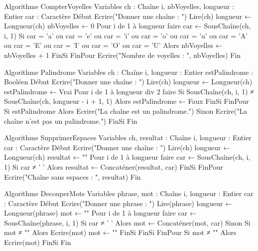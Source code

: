 \begin{algo}
Algorithme CompterVoyelles
Variables
    ch : Chaîne
    i, nbVoyelles, longueur : Entier
    car : Caractère
Début
    Ecrire("Donner une chaîne : ")
    Lire(ch)
    longueur ← Longueur(ch)
    nbVoyelles ← 0
    Pour i de 1 à longueur faire
        car ← SousChaîne(ch, i, 1)
        Si car = 'a' ou car = 'e' ou car = 'i' ou car = 'o' ou car = 'u' ou
           car = 'A' ou car = 'E' ou car = 'I' ou car = 'O' ou car = 'U' Alors
            nbVoyelles ← nbVoyelles + 1
        FinSi
    FinPour
    Ecrire("Nombre de voyelles : ", nbVoyelles)
Fin
\end{algo}

\begin{algo}
Algorithme Palindrome
Variables
    ch : Chaîne
    i, longueur : Entier
    estPalindrome : Booléen
Début
    Ecrire("Donner une chaîne : ")
    Lire(ch)
    longueur ← Longueur(ch)
    estPalindrome ← Vrai
    Pour i de 1 à longueur div 2 faire
        Si SousChaîne(ch, i, 1) ≠ SousChaîne(ch, longueur - i + 1, 1) Alors
            estPalindrome ← Faux
        FinSi
    FinPour
    Si estPalindrome Alors
        Ecrire("La chaîne est un palindrome.")
    Sinon
        Ecrire("La chaîne n'est pas un palindrome.")
    FinSi
Fin
\end{algo}

\begin{algo}
Algorithme SupprimerEspaces
Variables
    ch, resultat : Chaîne
    i, longueur : Entier
    car : Caractère
Début
    Ecrire("Donner une chaîne : ")
    Lire(ch)
    longueur ← Longueur(ch)
    resultat ← ""
    Pour i de 1 à longueur faire
        car ← SousChaîne(ch, i, 1)
        Si car ≠ ' ' Alors
            resultat ← Concaténer(resultat, car)
        FinSi
    FinPour
    Ecrire("Chaîne sans espaces : ", resultat)
Fin
\end{algo}

\begin{algo}
Algorithme DecouperMots
Variables
    phrase, mot : Chaîne
    i, longueur : Entier
    car : Caractère
Début
    Ecrire("Donner une phrase : ")
    Lire(phrase)
    longueur ← Longueur(phrase)
    mot ← ""
    Pour i de 1 à longueur faire
        car ← SousChaîne(phrase, i, 1)
        Si car ≠ ' ' Alors
            mot ← Concaténer(mot, car)
        Sinon
            Si mot ≠ "" Alors
                Ecrire(mot)
                mot ← ""
            FinSi
        FinSi
    FinPour
    Si mot ≠ "" Alors
        Ecrire(mot)
    FinSi
Fin
\end{algo}


